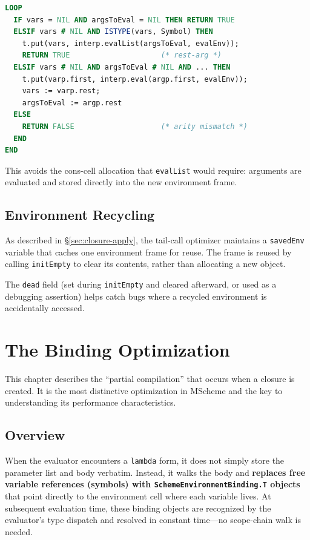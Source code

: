 \documentclass[12pt]{report}
\begin{document}
\begin{lstlisting}[language=Modula3]
LOOP
  IF vars = NIL AND argsToEval = NIL THEN RETURN TRUE
  ELSIF vars # NIL AND ISTYPE(vars, Symbol) THEN
    t.put(vars, interp.evalList(argsToEval, evalEnv));
    RETURN TRUE                     (* rest-arg *)
  ELSIF vars # NIL AND argsToEval # NIL AND ... THEN
    t.put(varp.first, interp.eval(argp.first, evalEnv));
    vars := varp.rest;
    argsToEval := argp.rest
  ELSE
    RETURN FALSE                    (* arity mismatch *)
  END
END
\end{lstlisting}

This avoids the cons-cell allocation that \texttt{evalList} would
require: arguments are evaluated and stored directly into the new
environment frame.

\section{Environment Recycling}
\label{sec:envrecycle}

As described in \S\ref{sec:closure-apply}, the tail-call optimizer
maintains a \texttt{savedEnv} variable that caches one environment
frame for reuse.  The frame is reused by calling \texttt{initEmpty}
to clear its contents, rather than allocating a new object.

The \texttt{dead} field (set during \texttt{initEmpty} and cleared
afterward, or used as a debugging assertion) helps catch bugs where
a recycled environment is accidentally accessed.

\chapter{The Binding Optimization}
\label{ch:closures}

This chapter describes the ``partial compilation'' that occurs when a
closure is created.  It is the most distinctive optimization in MScheme
and the key to understanding its performance characteristics.

\section{Overview}

When the evaluator encounters a \texttt{lambda} form, it does not
simply store the parameter list and body verbatim.  Instead, it walks
the body and \textbf{replaces free variable references (symbols) with
\texttt{SchemeEnvironmentBinding.T} objects} that point directly to the
environment cell where each variable lives.  At subsequent evaluation
time, these binding objects are recognized by the evaluator's type
dispatch and resolved in constant time---no scope-chain walk is
needed.
\end{document}
